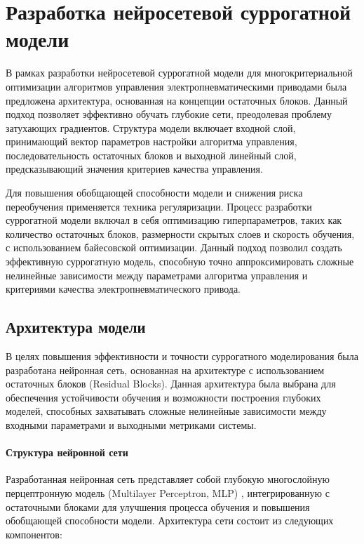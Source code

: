
\section{Разработка нейросетевой суррогатной модели}\label{sec:ch4/sec4}
В рамках разработки нейросетевой суррогатной модели для многокритериальной
оптимизации алгоритмов управления электропневматическими приводами была предложена
архитектура, основанная на концепции остаточных блоков. Данный подход позволяет
эффективно обучать глубокие сети, преодолевая проблему затухающих градиентов.
Структура модели включает входной слой, принимающий вектор параметров настройки
алгоритма управления, последовательность остаточных блоков и выходной линейный слой,
предсказывающий значения критериев качества управления.

Для повышения обобщающей способности модели и снижения
риска переобучения применяется техника регуляризации.
Процесс разработки суррогатной модели включал в себя оптимизацию
гиперпараметров, таких как количество остаточных блоков, размерности
скрытых слоев и скорость обучения, с использованием байесовской оптимизации.
Данный подход позволил создать эффективную суррогатную модель, способную
точно аппроксимировать сложные нелинейные зависимости между параметрами
алгоритма управления и критериями качества электропневматического привода.

\subsection{Архитектура модели}\label{sec:ch4/sec4/subsec1}

В целях повышения эффективности и точности суррогатного моделирования была разработана нейронная сеть,
основанная на архитектуре с использованием остаточных блоков (Residual Blocks). Данная архитектура была
выбрана для обеспечения устойчивости обучения и возможности построения глубоких моделей, способных захватывать
сложные нелинейные зависимости между входными параметрами и выходными метриками системы.

\paragraph{Структура нейронной сети}\label{sec:ch4/sec4/subsec1/subsubsec1}

Разработанная нейронная сеть представляет собой глубокую многослойную перцептронную модель (Multilayer Perceptron, MLP) \cite*{goodfellow2016deep},
интегрированную с остаточными блоками для улучшения процесса обучения и повышения обобщающей способности модели.
Архитектура сети состоит из следующих компонентов:

